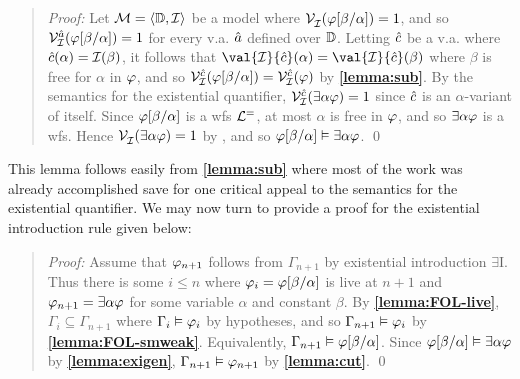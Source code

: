 \begin{quote} 
  \textit{Proof:} Let $\mathcal{M}=\langle\mathbb{D},\mathcal{I}\rangle$ be a model where $\mathcal{V}_{\mathcal{I}}^{}(\varphi[\beta/\alpha])=1$, and so $\mathcal{V}_{\mathcal{I}}^{\hat{a}}(\varphi[\beta/\alpha])=1$ for every v.a. $\hat{a}$ defined over $\mathbb{D}$.
  Letting $\hat{c}$ be a v.a. where $\hat{c}(\alpha)=\mathcal{I}(\beta)$, it follows that $\val{\I}{\va{c}}(\alpha)=\val{\I}{\va{c}}(\beta)$ where $\beta$ is free for $\alpha$ in $\varphi$, and so $\mathcal{V}_{\mathcal{I}}^{\hat{c}}(\varphi[\beta/\alpha])=\mathcal{V}_{\mathcal{I}}^{\hat{c}}(\varphi)$ by \textbf{\ref{lemma:sub}}.
  By the semantics for the existential quantifier, $\mathcal{V}_{\mathcal{I}}^{\hat{c}}(\exists \alpha\varphi)=1$ since $\hat{c}$ is an $\alpha$-variant of itself.
  Since $\varphi[\beta/\alpha]$ is a wfs $\mathcal{L}^{=}$, at most $\alpha$ is free in $\varphi$, and so $\exists \alpha\varphi$ is a wfs. 
  Hence $\mathcal{V}_{\mathcal{I}}^{}(\exists \alpha\varphi)=1$ by , and so $\varphi[\beta/\alpha] \vDash \exists\alpha\varphi$.
  \qed
\end{quote}

This lemma follows easily from \textbf{\ref{lemma:sub}} where most of the work was already accomplished save for one critical appeal to the semantics for the existential quantifier.
We may now turn to provide a proof for the existential introduction rule given below:




\begin{quote} 
  \textit{Proof:} Assume that $\varphi_{n+1}$ follows from $\Gamma_{n+1}$ by existential introduction $\exists$I.
  Thus there is some $i\leq n$ where $\varphi_i=\varphi[\beta/\alpha]$ is live at $n+1$ and $\varphi_{n+1}=\exists \alpha\varphi$ for some variable $\alpha$ and constant $\beta$.
  By \textbf{\ref{lemma:FOL-live}}, $\Gamma_i\subseteq \Gamma_{n+1}$ where $\Gamma_i\vDash\varphi_i$ by hypotheses, and so $\Gamma_{n+1} \vDash \varphi_i$ by \textbf{\ref{lemma:FOL-smweak}}.
  Equivalently, $\Gamma_{n+1} \vDash \varphi[\beta/\alpha]$.
  Since $\varphi[\beta/\alpha] \vDash \exists \alpha\varphi$ by \textbf{\ref{lemma:exigen}}, $\Gamma_{n+1}\vDash\varphi_{n+1}$ by \textbf{\ref{lemma:cut}}.
  \qed
\end{quote}

